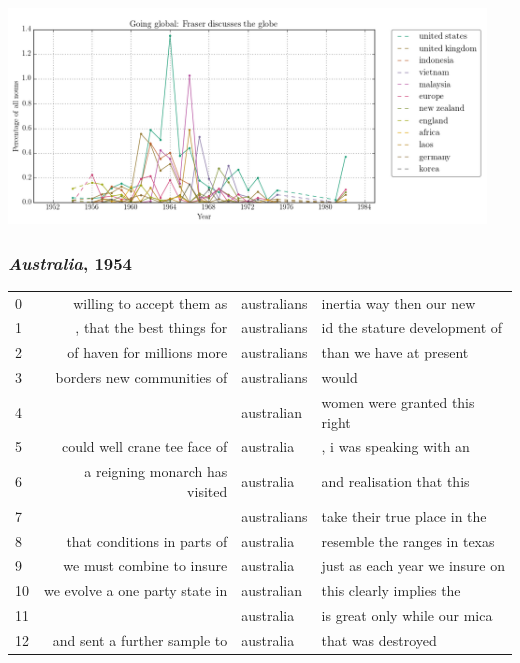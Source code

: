\documentclass{beamer}       %
\begin{document}
\begin{frame}
    \centering
    \includegraphics[width=0.95\textwidth]{images/going-global-fraser-discusses-the-globe.png}
\end{frame}


\begin{frame}
	\frametitle{\emph{Australia}, 1954}
\begin{table}
\tiny
\begin{tabular}{lrll}
   0 &        willing to accept them as & australians  & inertia way then our new \\
   1 &       , that the best things for & australians  & id the stature development of \\
   2 &       of haven for millions more & australians  & than we have at present \\
   3 &       borders new communities of & australians  & would \\
   4 &                                  & australian   & women were granted this right \\
   5 &     could well crane tee face of & australia    & , i was speaking with an \\
   6 &   a reigning monarch has visited & australia    & and realisation that this \\
   7 &                                  & australians  & take their true place in the \\
   8 &      that conditions in parts of & australia    & resemble the ranges in texas \\
   9 &        we must combine to insure & australia    & just as each year we insure on \\
  10 &   we evolve a one party state in & australian   & this clearly implies the \\
  11 &                                  & australia    & is great only while our mica \\
  12 &     and sent a further sample to & australia    & that was destroyed \\

\end{tabular}
\end{table}
\end{frame}
\end{document}
